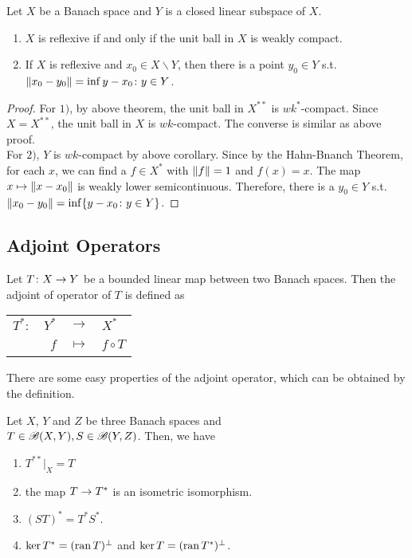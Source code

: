 \documentclass[a4paper,11pt]{report}
\begin{document}
\begin{cor}
	Let $X$ be a Banach space and $Y$ is a closed linear subspace of $X$.
	\begin{enumerate}[label=\arabic*)]
		\item $X$ is reflexive if and only if the unit ball in $X$ is weakly compact.
		\item If $X$ is reflexive and $x_0 \in X \backslash Y$, then there is a point $y_0 \in Y$ s.t. $\left\lVert x_0-y_0\right\lVert = \operatorname{inf}{y-x_0 \colon y \in Y}$.
	\end{enumerate}
\end{cor}
\begin{proof}
	For $1)$, by above theorem, the unit ball in $X^{**}$ is $wk^{*}$-compact. Since $X=X^{**}$, the unit ball in $X$ is $wk$-compact. The converse is similar as above proof.\\
	For $2)$, $Y$ is $wk$-compact by above corollary. Since by the Hahn-Bnanch Theorem, for each $x$, we can find a $f \in X^{*}$ with $\left\lVert f\right\lVert=1$ and $f(x)=x$. The map $x \mapsto \left\lVert x-x_0\right\lVert$ is weakly lower semicontinuous. Therefore, there is a $y_0 \in Y$ s.t. $\left\lVert x_0-y_0\right\lVert = \operatorname{inf}\{y-x_0 \colon y \in Y\}$.
\end{proof}

\subsection{Adjoint Operators} \label{sec1}

\begin{defn}
	Let $T \colon X \rightarrow Y$ be a bounded linear map between two Banach spaces. Then the adjoint of operator of $T$ is defined as
		\begin{center}
			\begin{tabular}{l r c l}
				$T^{*} \colon$ & $Y^{*}$ & $\longrightarrow$ & $X^{*}$ \\
				~ & $f$ & $\longmapsto$ & $f \circ T$
			\end{tabular}
		\end{center}	
\end{defn}

There are some easy properties of the adjoint operator, which can be obtained by the definition.
\begin{prop} \label{prop4}
	Let $X$, $Y$ and $Z$ be three Banach spaces and\\ $T \in \mathscr{B}(X,Y), S \in \mathscr{B}(Y,Z)$. Then, we have
	\begin{enumerate}[label=\arabic*)]
		\item $T^{**}|_X = T$
		\item the map $T \rightarrow T^{*}$ is an isometric isomorphism.
		\item $(ST)^{*} = T^{*}S^{*}$.
		\item $\ker{T^{*}} = (\operatorname{ran}{T})^{\bot}$ and $\ker{T}=(\operatorname{ran}{T^{*}})^{\bot}$.
	\end{enumerate}
\end{prop}
\end{document}
